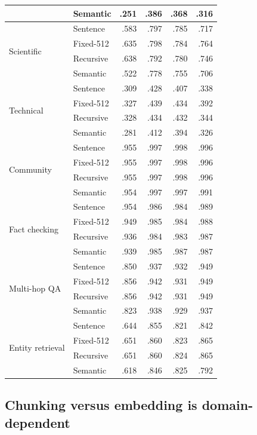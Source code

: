 \documentclass[10pt,letterpaper]{article}
\begin{document}
\begin{table}[t]
\begin{tabular}{llrrrr}
 & Semantic & .251 & .386 & .368 & .316 \\
\midrule
\multirow{4}{*}{Scientific} & Sentence & .583 & .797 & .785 & .717 \\
 & Fixed-512 & .635 & .798 & .784 & .764 \\
 & Recursive & .638 & .792 & .780 & .746 \\
 & Semantic & .522 & .778 & .755 & .706 \\
\midrule
\multirow{4}{*}{Technical} & Sentence & .309 & .428 & .407 & .338 \\
 & Fixed-512 & .327 & .439 & .434 & .392 \\
 & Recursive & .328 & .434 & .432 & .344 \\
 & Semantic & .281 & .412 & .394 & .326 \\
\midrule
\multirow{4}{*}{Community} & Sentence & .955 & .997 & .998 & .996 \\
 & Fixed-512 & .955 & .997 & .998 & .996 \\
 & Recursive & .955 & .997 & .998 & .996 \\
 & Semantic & .954 & .997 & .997 & .991 \\
\midrule
\multirow{4}{*}{Fact checking} & Sentence & .954 & .986 & .984 & .989 \\
 & Fixed-512 & .949 & .985 & .984 & .988 \\
 & Recursive & .936 & .984 & .983 & .987 \\
 & Semantic & .939 & .985 & .987 & .987 \\
\midrule
\multirow{4}{*}{Multi-hop QA} & Sentence & .850 & .937 & .932 & .949 \\
 & Fixed-512 & .856 & .942 & .931 & .949 \\
 & Recursive & .856 & .942 & .931 & .949 \\
 & Semantic & .823 & .938 & .929 & .937 \\
\midrule
\multirow{4}{*}{Entity retrieval} & Sentence & .644 & .855 & .821 & .842 \\
 & Fixed-512 & .651 & .860 & .823 & .865 \\
 & Recursive & .651 & .860 & .824 & .865 \\
 & Semantic & .618 & .846 & .825 & .792 \\
\bottomrule
\end{tabular}
\end{table}

\subsection{Chunking versus embedding is domain-dependent}
\end{document}
